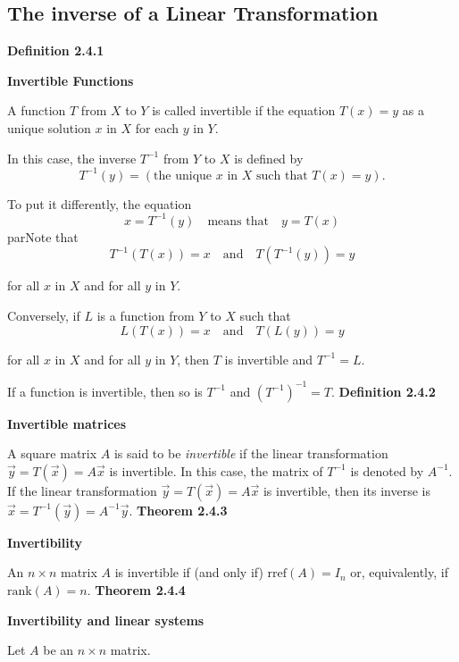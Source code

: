 \subsection{The inverse of a Linear Transformation}
\textbf{Definition 2.4.1}\\
\par\noindent\textbf{Invertible Functions}
\par\noindent A function $T$ from $X$ to $Y$ is called invertible if the equation $T(x)=y$ as a unique solution $x$ in $X$ for each $y$ in $Y$.
\par\noindent In this case, the inverse $T^{-1}$ from $Y$ to $X$ is defined by
\[T^{-1}(y)=\left(\textrm{the unique }x\textrm{ in }X\textrm{ such that }T(x)=y\right).\]
\par\noindent To put it differently, the equation
\[x=T^{-1}(y)\quad\textrm{means that}\quad y=T(x)\]
par\noindent Note that
\[T^{-1}(T(x))=x\quad\textrm{and}\quad T(T^{-1}(y))=y\]
\par\noindent for all $x$ in $X$ and for all $y$ in $Y$.
\par\noindent Conversely, if $L$ is a function from $Y$ to $X$ such that
\[L(T(x))=x\quad\textrm{and}\quad T(L(y))=y\]
\par\noindent for all $x$ in $X$ and for all $y$ in $Y$, then $T$ is invertible and $T^{-1}=L$.
\par\noindent If a function is invertible, then so is $T^{-1}$ and $(T^{-1})^{-1}=T$.
\textbf{Definition 2.4.2}\\
\par\noindent\textbf{Invertible matrices}
\par\noindent A square matrix $A$ is said to be \textit{invertible} if the linear transformation $\vec{y}=T(\vec{x})=A\vec{x}$ is invertible. In this case, the matrix of $T^{-1}$ is denoted by $A^{-1}$. If the linear transformation $\vec{y}=T(\vec{x})=A\vec{x}$ is invertible, then its inverse is $\vec{x}=T^{-1}(\vec{y})=A^{-1}\vec{y}$.
\textbf{Theorem 2.4.3}\\
\par\noindent\textbf{Invertibility}
\par\noindent An $n\times{}n$ matrix $A$ is invertible if (and only if) $\textrm{rref}(A)=I_{n}$ or, equivalently, if $\textrm{rank}(A)=n$.
\textbf{Theorem 2.4.4}\\
\par\noindent\textbf{Invertibility and linear systems}
\par\noindent Let $A$ be an $n\times{}n$ matrix.
\renewcommand{\labelenumi}{\textbf{\alph{enumi}.}}
